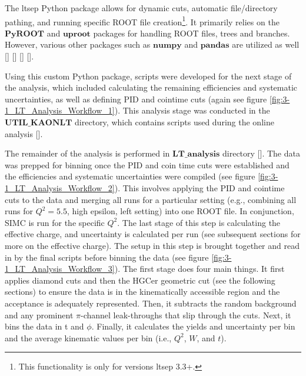 \documentclass[
]{report}
\begin{document}


The ltsep Python package allows for dynamic cuts, automatic
file/directory pathing, and running specific ROOT file
creation\footnote{This functionality is only for versions ltsep 3.3+.}.
It primarily relies on the \(\textbf{PyROOT}\) and \(\textbf{uproot}\)
packages for handling ROOT files, trees and branches. However, various
other packages such as \(\textbf{numpy}\) and \(\textbf{pandas}\) are
utilized as well {[}\cite{pivarski_Python_2021}{]}
{[}\cite{root_team_how_2023}{]} {[}\cite{numpy_developers_numpy_2023}{]}
{[}\cite{numfocus_inc_pandas_2023}{]}.



Using this custom Python package, scripts were developed for the next
stage of the analysis, which included calculating the remaining
efficiencies and systematic uncertainties, as well as defining PID and
cointime cuts (again see figure \ref{fig:3-1_LT_Analysis_Workflow_1}).
This analysis stage was conducted in the \(\textbf{UTIL\_KAONLT}\)
directory, which contains scripts used during the online analysis
{[}\cite{kay_github_2018}{]}.



The remainder of the analysis is performed in \(\textbf{LT\_analysis}\)
directory {[}\cite{trotta_github_2022}{]}. The data was prepped for
binning once the PID and coin time cuts were established and the
efficiencies and systematic uncertainties were compiled (see figure
\ref{fig:3-1_LT_Analysis_Workflow_2}). This involves applying the PID
and cointime cuts to the data and merging all runs for a particular
setting (e.g., combining all runs for \(Q^2=5.5\), high epsilon, left
setting) into one ROOT file. In conjunction, SIMC is run for the
specific \(Q^2\). The last stage of this step is calculating the
effective charge, and uncertainty is calculated per run (see subsequent
sections for more on the effective charge). The setup in this step is
brought together and read in by the final scripts before binning the
data (see figure \ref{fig:3-1_LT_Analysis_Workflow_3}). The first stage
does four main things. It first applies diamond cuts and then the HGCer
geometric cut (see the following sections) to ensure the data is in the
kinematically accessible region and the acceptance is adequately
represented. Then, it subtracts the random background and any prominent
\(\pi\)-channel leak-throughs that slip through the cuts. Next, it bins
the data in t and \(\phi\). Finally, it calculates the yields and
uncertainty per bin and the average kinematic values per bin (i.e.,
\(Q^2\), \(W\), and \(t\)).
\end{document}
